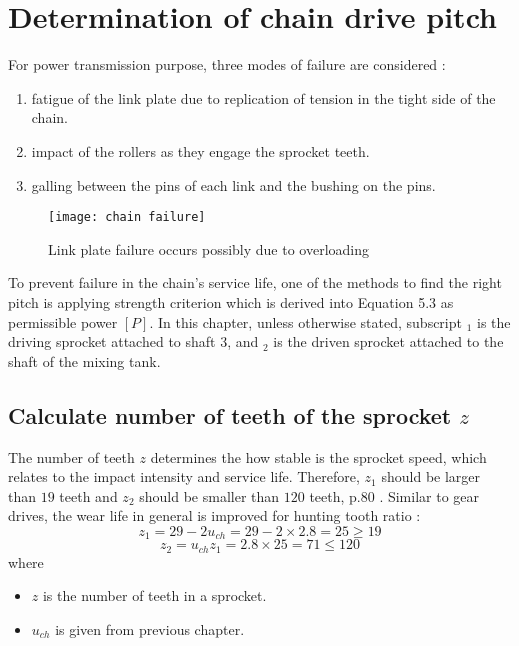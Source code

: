 \section{Determination of chain drive pitch}
For power transmission purpose, three modes of failure are considered \cite{mott_vavrek_wang_2018}:
\begin{enumerate}
	\item fatigue of the link plate due to replication of tension in the tight side of the chain.
	\item impact of the rollers as they engage the sprocket teeth.
	\item galling between the pins of each link and the bushing on the pins.
\end{enumerate}
\begin{figure}[ht]
	\centering
	\texttt{[image: chain failure]}
	\caption{Link plate failure occurs possibly due to overloading}
	\label{fig:chain failure}
\end{figure}


To prevent failure in the chain's service life, one of the methods to find the right pitch is applying strength criterion which is derived into Equation 5.3 \cite{tk1} as permissible power $ [P] $. In this chapter, unless otherwise stated, subscript $ _1 $ is the driving sprocket attached to shaft 3, and $ _2 $ is the driven sprocket attached to the shaft of the mixing tank.

\subsection{Calculate number of teeth of the sprocket $ z $}
The number of teeth $ z $ determines the how stable is the sprocket speed, which relates to the impact intensity and service life. Therefore, $ z_1 $ should be larger than $ 19 $ teeth and $ z_2 $ should be smaller than $ 120 $ teeth, p.80 \cite{tk1}. Similar to gear drives, the wear life in general is improved for hunting tooth ratio \cite{ibt_industrial_solutions}:\\
\[ z_1 = 29 - 2u_{ch} = 29 - 2 \times 2.8 = 25 \geq 19\]
\[ z_2 = u_{ch}z_1 = 2.8 \times 25 = 71 \leq 120\]
where
\begin{itemize}
	\item $ z $ is the number of teeth in a sprocket.
	\item $ u_{ch} $ is given from previous chapter.
\end{itemize}

